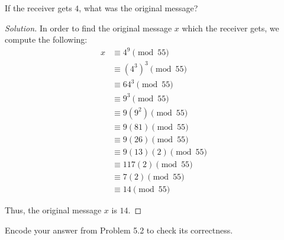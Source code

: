 \documentclass{article}
\newenvironment{solution}{\begin{proof}[Solution]}{\end{proof}}
\begin{document}
\begin{hw}
	If the receiver gets $4$, what was the original message?
\end{hw}
\begin{solution}
	In order to find the original message $x$ which the receiver gets, we compute the following:
	\begin{align*}
		x &\equiv 4^{9} \pmod{55} \\
		&\equiv (4^{3})^{3} \pmod{55} \\
		&\equiv 64^{3} \pmod{55} \\
		&\equiv 9^{3} \pmod{55} \\
		&\equiv 9(9^{2}) \pmod{55} \\
		&\equiv 9(81) \pmod{55} \\
		&\equiv 9(26) \pmod{55} \\
		&\equiv 9(13)(2) \pmod{55} \\
		&\equiv 117(2) \pmod{55} \\
		&\equiv 7(2) \pmod{55} \\
		&\equiv 14 \pmod{55}
	\end{align*}

	Thus, the original message $x$ is $14$.
\end{solution}
\newpage
\begin{hw}
	Encode your answer from Problem 5.2 to check its correctness.
\end{hw}
\end{document}
